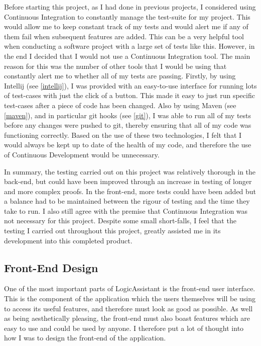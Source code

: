 Before starting this project, as I had done in previous projects, I considered using Continuous Integration to constantly manage the test-suite for my project. This would allow me to keep constant track of my tests and would alert me if any of them fail when subsequent features are added. This can be a very helpful tool when conducting a software project with a large set of tests like this. However, in the end I decided that I would not use a Continuous Integration tool. The main reason for this was the number of other tools that I would be using that constantly alert me to whether all of my tests are passing. Firstly, by using Intellij (see \ref{intellij}), I was provided with an easy-to-use interface for running lots of test-cases with just the click of a button. This made it easy to just run specific test-cases after a piece of code has been changed. Also by using Maven (see \ref{maven}), and in particular git hooks (see \ref{git}), I was able to run all of my tests before any changes were pushed to git, thereby ensuring that all of my code was functioning correctly. Based on the use of these two technologies, I felt that I would always be kept up to date of the health of my code, and therefore the use of Continuous Development would be unnecessary.

In summary, the testing carried out on this project was relatively thorough in the back-end, but could have been improved through an increase in testing of longer and more complex proofs. In the front-end, more tests could have been added but a balance had to be maintained between the rigour of testing and the time they take to run. I also still agree with the premise that Continuous Integration was not necessary for this project. Despite some small short-falls, I feel that the testing I carried out throughout this project, greatly assisted me in its development into this completed product.

\subsection{Front-End Design}

One of the most important parts of LogicAssistant is the front-end user interface. This is the component of the application which the users themselves will be using to access its useful features, and therefore must look as good as possible. As well as being aesthetically pleasing, the front-end must also boast features which are easy to use and could be used by anyone. I therefore put a lot of thought into how I was to design the front-end of the application.

